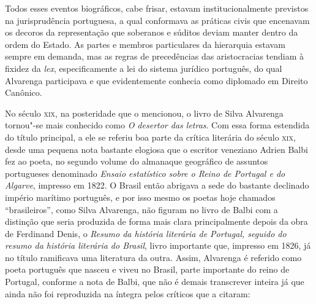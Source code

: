 Todos esses eventos biográficos, cabe frisar, estavam
institucionalmente previstos na jurisprudência portuguesa, a qual conformava as
práticas civis que encenavam os decoros da representação que soberanos e súditos
deviam manter dentro da ordem do Estado.  As partes e membros particulares da
hierarquia estavam sempre em demanda, mas as regras de precedências das
aristocracias tendiam à fixidez da \textit{lex}, especificamente a lei do
sistema jurídico português, do qual Alvarenga participava e que evidentemente
conhecia como diplomado em Direito Canônico.

No século \textsc{xix}, na posteridade que o mencionou, o livro de Silva Alvarenga
tornou"-se mais conhecido como \textit{O desertor das letras}. Com essa forma
estendida do título principal, a ele se referiu boa parte da crítica literária
do século \textsc{xix}, desde uma pequena nota bastante elogiosa que o escritor
veneziano Adrien Balbi fez ao poeta, no segundo volume do almanaque geográfico
de assuntos portugueses denominado \textit{Ensaio estatístico sobre o Reino de
Portugal e do Algarve}, impresso em 1822.  O Brasil então abrigava a sede do
bastante declinado império marítimo português, e por isso mesmo os poetas hoje
chamados ``brasileiros'', como Silva Alvarenga, não figuram no livro de Balbi
com a distinção que seria produzida de forma mais clara principalmente depois da
obra de Ferdinand Denis, o \textit{Resumo da história literária de Portugal,
seguido do resumo da história literária do Brasil}, livro importante que,
impresso em 1826, já no título ramificava uma literatura da outra. Assim,
Alvarenga é referido como poeta português que nasceu e viveu no Brasil, parte
importante do reino de Portugal, conforme a nota de Balbi, que não é demais
transcrever inteira já que ainda não foi reproduzida na íntegra pelos críticos
que a citaram:

